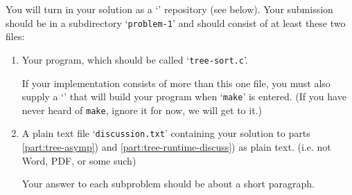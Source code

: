 \documentclass[11pt]{article}
\begin{document}
You will turn in your solution as a
`'
repository (see below).
Your submission should be in a subdirectory `\texttt{problem-1}' and
should consist of at least these two files:

\begin{enumerate}
  \item Your program, which should be called `\texttt{tree-sort.c}'.

    If your implementation consists of more than this
    one file, you must also supply a
    `'
    that will build your program when `\texttt{make}' is entered.
    (If you have never heard of \texttt{make}, ignore it for now,
    we will get to it.)

  \item A plain text file `\texttt{discussion.txt}' containing
    your solution to parts \ref{part:tree-asymp})
    and \ref{part:tree-runtime-discuss}) as plain
    text. (i.e. not Word, PDF, or some such)

    Your answer to each subproblem should be about a short paragraph.
\end{enumerate}

\end{document}
